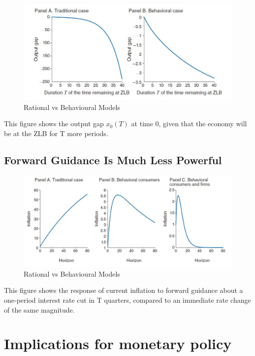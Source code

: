 \documentclass{beamer}
\newcommand\ReduceFont{\fontsize{10}{7.2}\selectfont}
\begin{document}
\begin{frame}{\subsecname}
    \begin{figure}
        \centering
        \includegraphics[scale=0.8]{Graphs_Macro/Figure1.JPG}
        \caption{Rational vs Behavioural Models}
        \label{fig:1}
    \end{figure}
    This figure shows the output gap $x_{0}(T)$ at time 0, given that the economy will be at the ZLB for T more periods.
\end{frame}

\subsection{Forward Guidance Is Much Less Powerful}

\begin{frame}{\subsecname}
    \begin{figure}
        \centering
        \includegraphics[scale=0.7]{Graphs_Macro/Figure2.JPG}
        \caption{Rational vs Behavioural Models}
        \label{fig:2}
    \end{figure} 
    This figure shows the response of current inflation to forward guidance about a one-period interest rate cut in T quarters, compared to an immediate rate change of the same magnitude.
\end{frame}

\section{Implications for monetary policy}
\begin{frame}
    \ReduceFont
\end{frame}
\end{document}
